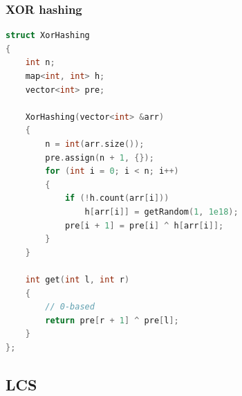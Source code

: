 \documentclass[10pt,landscape,a4paper,twocolumn]{article}
\begin{document}
\subsubsection{XOR hashing}
\begin{lstlisting}[language=C++]
struct XorHashing
{
    int n;
    map<int, int> h;
    vector<int> pre;

    XorHashing(vector<int> &arr)
    {
        n = int(arr.size());
        pre.assign(n + 1, {});
        for (int i = 0; i < n; i++)
        {
            if (!h.count(arr[i]))
                h[arr[i]] = getRandom(1, 1e18);
            pre[i + 1] = pre[i] ^ h[arr[i]];
        }
    }

    int get(int l, int r)
    {
        // 0-based
        return pre[r + 1] ^ pre[l];
    }
};

\end{lstlisting}
\subsection{LCS}
\end{document}
